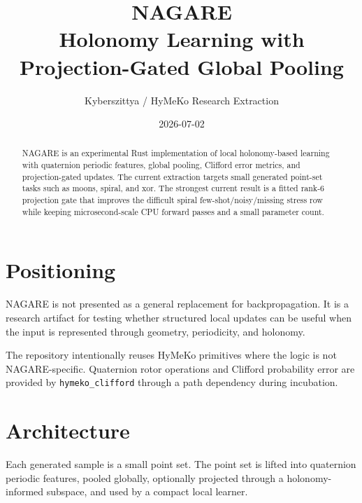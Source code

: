 \documentclass[11pt]{article}
\title{\textbf{NAGARE}\\Holonomy Learning with Projection-Gated Global Pooling}
\author{Kyberszittya / HyMeKo Research Extraction}
\date{2026-07-02}
\begin{document}
\maketitle

\begin{abstract}
NAGARE is an experimental Rust implementation of local holonomy-based learning
with quaternion periodic features, global pooling, Clifford error metrics, and
projection-gated updates. The current extraction targets small generated
point-set tasks such as moons, spiral, and xor. The strongest current result is
a fitted rank-6 projection gate that improves the difficult spiral
few-shot/noisy/missing stress row while keeping microsecond-scale CPU forward
passes and a small parameter count.
\end{abstract}

\section{Positioning}

NAGARE is not presented as a general replacement for backpropagation. It is a
research artifact for testing whether structured local updates can be useful
when the input is represented through geometry, periodicity, and holonomy.

The repository intentionally reuses HyMeKo primitives where the logic is not
NAGARE-specific. Quaternion rotor operations and Clifford probability error are
provided by \texttt{hymeko\_clifford} through a path dependency during
incubation.

\section{Architecture}

Each generated sample is a small point set. The point set is lifted into
quaternion periodic features, pooled globally, optionally projected through a
holonomy-informed subspace, and used by a compact local learner.
\end{document}
